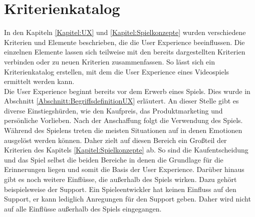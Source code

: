 \section{Kriterienkatalog}
\label{Abschnitt:MyKriterienKatalog} 

In den Kapiteln \ref{Kapitel:UX} und \ref{Kapitel:Spielkonzepte} wurden verschiedene Kriterien und Elemente beschrieben, die die User Experience beeinflussen. Die einzelnen Elemente lassen sich teilweise mit den bereits dargestellten Kriterien verbinden oder zu neuen Kriterien zusammenfassen. So lässt sich ein Kriterienkatalog erstellen, mit dem die User Experience eines Videospiels ermittelt werden kann. \\
Die User Experience beginnt bereits vor dem Erwerb eines Spiels. Dies wurde in Abschnitt \ref{Abschnitt:BegriffsdefinitionUX} erläutert. An dieser Stelle gibt es diverse Einstiegshürden, wie den Kaufpreis, das Produktmarketing und persönliche Vorlieben. Nach der Anschaffung folgt die Verwendung des Spiels. Während des Spielens treten die meisten Situationen auf in denen Emotionen ausgelöst werden können. Daher zielt auf diesen Bereich ein Großteil der Kriterien des Kapitels \ref{Kapitel:Spielkonzepte} ab. So sind die Kaufentscheidung und das Spiel selbst die beiden Bereiche in denen die Grundlage für die Erinnerungen liegen und somit die Basis der User Experience. Darüber hinaus gibt es noch weitere Einflüsse, die außerhalb des Spiels wirken. Dazu gehört beispielsweise der Support.  Ein Spieleentwickler hat keinen Einfluss auf den Support, er kann lediglich Anregungen für den Support geben. Daher wird nicht auf alle Einflüsse außerhalb des Spiels eingegangen.








